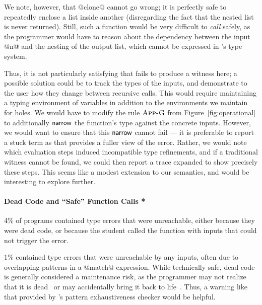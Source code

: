 We note, however, that @clone@ cannot go wrong; it is perfectly safe to
repeatedly enclose a list inside another (disregarding the fact that the
nested list is never returned).
%
Still, such a function would be very difficult to \emph{call} safely, as
the programmer would have to reason about the dependency between the
input @n@ and the nesting of the output list, which cannot be expressed
in \ocaml's type system.

Thus, it is not particularly satisfying that \toolname fails to produce
a witness here; a possible solution could be to track the types of the
inputs, and demonstrate to the user how they change between recursive
calls.
%
This would require maintaining a typing environment of variables in
addition to the environments we maintain for holes.
%
We would have to modify the rule $\textsc{App-G}$ from
Figure~\ref{fig:operational} to additionally $\mathsf{narrow}$ the function's
type against the concrete inputs.
%
However, we would want to ensure that this $\mathsf{narrow}$ cannot fail ---
it is preferable to report a stuck term as that provides a fuller view
of the error.
%
Rather, we would note which evaluation steps induced incompatible
type refinements, and if a traditional witness cannot be found, we could
then report a trace expanded to show precisely these steps.
%
This seems like a modest extension to our semantics, and would be
interesting to explore further.

\paragraph{Dead Code and ``Safe'' Function Calls *}
%
4\% of programs contained type errors that were unreachable, either
because they were dead code, or because the student called the function
with inputs that could not trigger the error.


1\% contained type errors that were unreachable by any inputs, often due
to overlapping patterns in a @match@ expression.
%
%
While technically safe, dead code is generally considered a maintenance
risk, as the programmer may not realize that it is dead~\cite{Wheeler2014-fg}
or may accidentally bring it back to life~\cite{Seven2014-gf}.
%
Thus, a warning like that provided by \ocaml's pattern exhaustiveness
checker would be helpful.


